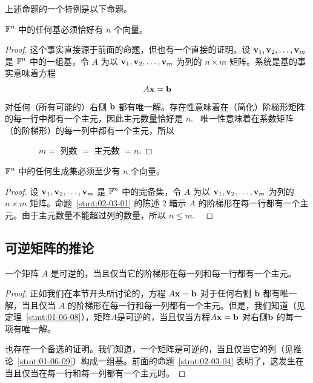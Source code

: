 上述命题的一个特例是以下命题。

\begin{proposition}\label{stmt:02-03-04}
$\mathbb{F}^n$ 中的任何基必须恰好有 $n$ 个向量。
\end{proposition}

\begin{proof} 这个事实直接源于前面的命题，但也有一个直接的证明。设 $\mathbf{v}_1, \mathbf{v}_2, \dots, \mathbf{v}_m$ 是 $\mathbb{F}^n$ 中的一组基，令 $A$ 为以 $\mathbf{v}_1, \mathbf{v}_2, \dots, \mathbf{v}_m$ 为列的 $n \times m$ 矩阵。系统是基的事实意味着方程
$$A \mathbf{x} = \mathbf{b}$$
对任何（所有可能的）右侧 $\mathbf{b}$ 都有唯一解。存在性意味着在（简化）阶梯形矩阵的每一行中都有一个主元，因此主元数量恰好是 $n$. ~唯一性意味着在系数矩阵（的阶梯形）的每一列中都有一个主元，所以

~~~~~~~~$m =$ 列数 $=$ 主元数 $= n$.\end{proof}

\begin{proposition}\label{stmt:02-03-05}
$\mathbb{F}^n$ 中的任何生成集必须至少有 $n$ 个向量。
\end{proposition}

\begin{proof} 设 $\mathbf{v}_1, \mathbf{v}_2, \dots, \mathbf{v}_m$ 是 $\mathbb{F}^n$ 中的完备集，令 $A$ 为以 $\mathbf{v}_1, \mathbf{v}_2, \dots, \mathbf{v}_m$ 为列的 $n \times m$ 矩阵。命题~\ref{stmt:02-03-01} 的陈述 2 暗示 $A$ 的阶梯形在每一行都有一个主元。由于主元数量不能超过列的数量，所以 $n \le m$. ~\end{proof}

\subsection{可逆矩阵的推论}\label{sec:02-03-02}

\begin{proposition}\label{stmt:02-03-06}
一个矩阵 $A$ 是可逆的，当且仅当它的阶梯形在每一列和每一行都有一个主元。
\end{proposition}

\begin{proof} 正如我们在本节开头所讨论的，方程 $A \mathbf{x} = \mathbf{b}$ 对于任何右侧 $\mathbf{b}$ 都有唯一解，当且仅当 $A$ 的阶梯形在每一行和每一列都有一个主元。但是，我们知道（见定理~\ref{stmt:01-06-08}），矩阵$A$是可逆的，当且仅当方程$A \mathbf{x} = \mathbf{b}$ 对右侧$ \mathbf{b}$ 的每一项有唯一解。

也存在一个备选的证明。我们知道，一个矩阵是可逆的，当且仅当它的列（见推论~\ref{stmt:01-06-09}）构成一组基。前面的命题~\ref{stmt:02-03-04} 表明了，这发生在当且仅当在每一行和每一列都有一个主元时。\end{proof}

